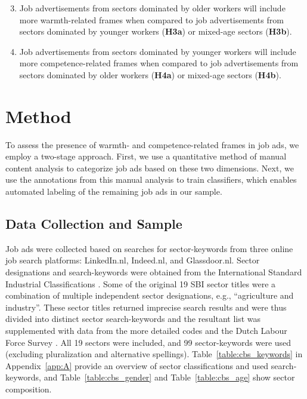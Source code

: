 \documentclass[man]{apa7}
\begin{document}
\begin{enumerate}[align=left, label={\textbf{Hypothesis \arabic*:}}]
\setcounter{enumi}{2}

\item Job advertisements from sectors dominated by older workers will include more warmth-related frames when compared to job advertisements from sectors dominated by younger workers (\textbf{H3a}) or mixed-age sectors (\textbf{H3b}).

\item Job advertisements from sectors dominated by younger workers will include more competence-related frames when compared to job advertisements from sectors dominated by older workers (\textbf{H4a}) or mixed-age sectors (\textbf{H4b}).

\end{enumerate}

\section{Method}
\label{method}
To assess the presence of warmth- and competence-related frames in job ads, we employ a two-stage approach. First, we use a quantitative method of manual content analysis to categorize job ads based on these two dimensions. Next, we use the annotations from this manual analysis to train classifiers, which enables automated labeling of the remaining job ads in our sample.

\subsection{Data Collection and Sample}
Job ads were collected based on searches for sector-keywords from three online job search platforms: LinkedIn.nl, Indeed.nl, and Glassdoor.nl. Sector designations and search-keywords were obtained from the International Standard Industrial Classifications \parencite[SBI;][]{centraal_bureau_voor_de_statistiek_standard_2018}. Some of the original 19 SBI sector titles were a combination of multiple independent sector designations, e.g., “agriculture and industry”. These sector titles returned imprecise search results and were thus divided into distinct sector search-keywords and the resultant list was supplemented with data from the more detailed codes and the Dutch Labour Force Survey \parencite{centraal_bureau_voor_de_statistiek_dutch_2021}. All 19 sectors were included, and 99 sector-keywords were used (excluding pluralization and alternative spellings). Table~\ref{table:cbs_keywords} in Appendix~\ref{app:A} provide an overview of sector classifications and used search-keywords, and Table~\ref{table:cbs_gender} and Table~\ref{table:cbs_age} show sector composition.
\end{document}
